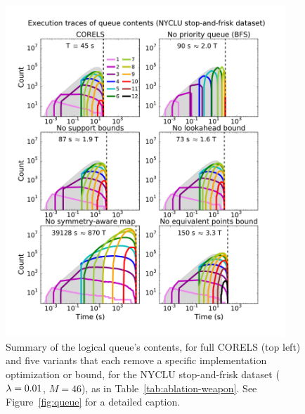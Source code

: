 \begin{figure}[t!]
\begin{center}
\includegraphics[trim={0mm 10mm 0mm 20mm},
width=0.94\textwidth]{figs/weapon_ablation-queue.pdf}
\end{center}
\vspace{-5mm}
\caption{Summary of the logical queue's contents, for full CORELS (top left)
and five variants that each remove a specific implementation optimization or bound,
for the NYCLU stop-and-frisk dataset (${{\lambda} = 0.01}$, ${M = 46}$), as in Table~\ref{tab:ablation-weapon}.
%
See Figure~\ref{fig:queue} for a detailed caption.
}
\label{fig:queue-weapon}
\end{figure}


